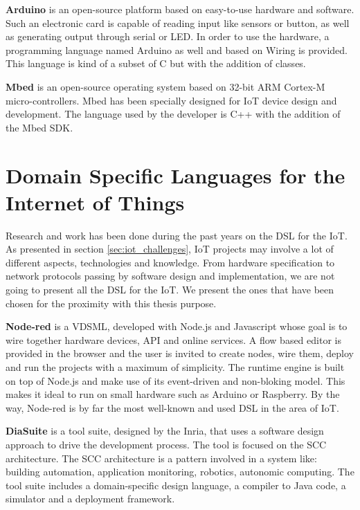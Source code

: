 \textbf{Arduino} is an open-source platform based on easy-to-use hardware and
software\cite{Arduino2017}. Such an electronic card is capable of reading input
like sensors or button, as well as generating output through serial or LED. In
order to use the hardware, a programming language named Arduino as well and
based on Wiring\cite{Arduino2017} is provided. This language is kind of a
subset of C but with the addition of classes.

\textbf{Mbed} is an open-source operating system based on 32-bit ARM Cortex-M
micro-control\-lers\cite{Toulson:2012:FEE:2385440}. Mbed has been specially designed
for \gls{IoT} device design and development. The language used by the developer
is C++ with the addition of the Mbed SDK\cite{Toulson:2012:FEE:2385440}.

\section{Domain Specific Languages for the Internet of Things}
\label{sec:dsl_for_iot}

Research and work has been done during the past years on the \gls{DSL} for the
\gls{IoT}. As presented in section \ref{sec:iot_challenges}, \gls{IoT} projects may
involve a lot of different aspects, technologies and knowledge. From hardware
specification to network protocols passing by software design and
implementation, we are not going to present all the \gls{DSL} for the \gls{IoT}.
We present the ones that have been chosen for the proximity with this thesis purpose.

\textbf{Node-red} is a \gls{VDSML}, developed with Node.js and
Javascript whose goal is to wire together hardware devices, API and online
services\cite{node-red}. A flow based editor is provided in the browser and
the user is invited to create nodes, wire them, deploy and run the projects
with a maximum of simplicity\cite{Salihbegovic2015}. The runtime engine is built
on top of Node.js and make use of its event-driven and non-bloking model. This
makes it ideal to run on small hardware such as Arduino or
Raspberry\cite{node-red}. By the way, Node-red is by far the most well-known and
used \gls{DSL} in the area of \gls{IoT}.

\textbf{DiaSuite} is a tool suite, designed by the Inria, that uses a
software design approach to drive the development process\cite{Bertran2012}.
The tool is focused on the \gls{SCC} architecture. The \gls{SCC} architecture is
a pattern involved in a system like: building automation, application monitoring,
robotics, autonomic computing\cite{Taylor:2009:SAF:1538494}. The tool suite
includes a domain-specific design language, a compiler to Java code, a simulator
and a deployment framework. 


